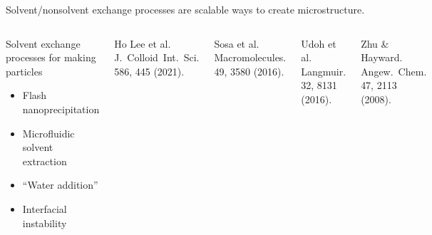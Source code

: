 \documentclass[aspectratio=169]{beamer}
\begin{document}
\begin{frame}{Solvent/nonsolvent exchange processes are scalable ways to create microstructure.}
\begin{columns}[T]

  \centering
  \vspace{-0.5\baselineskip}
  \begin{block}{Solvent exchange processes for making particles}
    \begin{itemize}
      \item Flash nanoprecipitation
      \item Microfluidic solvent extraction
      \item ``Water addition''
      \item Interfacial instability
    \end{itemize}
  \end{block}

  \vspace{6pt}
  \par
  \vspace{6pt}

  {\scriptsize{}
  Ho Lee et al. J.~Colloid~Int.~Sci. 586, 445 (2021).\par
  Sosa et al. Macromolecules. 49, 3580 (2016).\par
  Udoh et al. Langmuir. 32, 8131 (2016).\par
  Zhu \& Hayward. Angew.~Chem. 47, 2113 (2008).\par
  }


\end{columns}


\end{frame}
\end{document}
